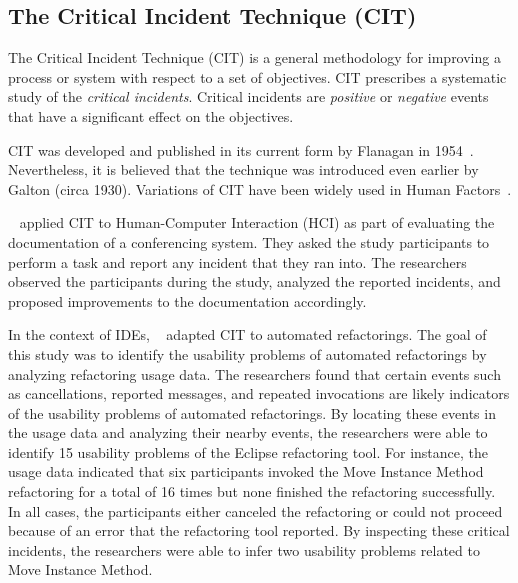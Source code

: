 
 
\subsection{The Critical Incident Technique (CIT)}

The Critical Incident Technique (CIT) is a general methodology for improving a
process or system with respect to a set of objectives. CIT prescribes a
systematic study of the \emph{critical incidents}. Critical incidents are
\emph{positive} or \emph{negative} events that have a significant effect on the
objectives.

CIT was developed and published in its current form by Flanagan in
1954~\citep{Flanagan1954CIT}. Nevertheless, it is believed that the technique was
introduced even earlier by Galton (circa 1930). Variations of CIT have been
widely used in Human Factors~\citep{ShattuckWoods1994CIT}.

~\citet{DelGaldo1986CIT} applied CIT to Human-Computer Interaction (HCI) as part
of evaluating the documentation of a conferencing system.
They asked the study participants to perform a task and report any incident that
they ran into. The researchers observed the participants during the study,
analyzed the reported incidents, and proposed improvements to the documentation
accordingly.

In the context of IDEs, ~\citet{VakilianJohnson2014Alternate} adapted CIT to automated
refactorings. The goal of this study was to
identify the usability problems of automated refactorings by analyzing
refactoring usage data. The researchers found that certain events such as
cancellations, reported messages, and repeated invocations are likely indicators
of the usability problems of automated refactorings. By locating these events in
the usage data and analyzing their nearby events, the researchers were able to
identify 15 usability problems of the Eclipse refactoring tool. For instance,
the usage data indicated that six participants invoked the Move Instance Method
refactoring for a total of 16 times but none finished the refactoring
successfully. In all cases, the participants either canceled the refactoring or
could not proceed because of an error that the refactoring tool reported. By
inspecting these critical incidents, the researchers were able to infer two
usability problems related to Move Instance Method.

